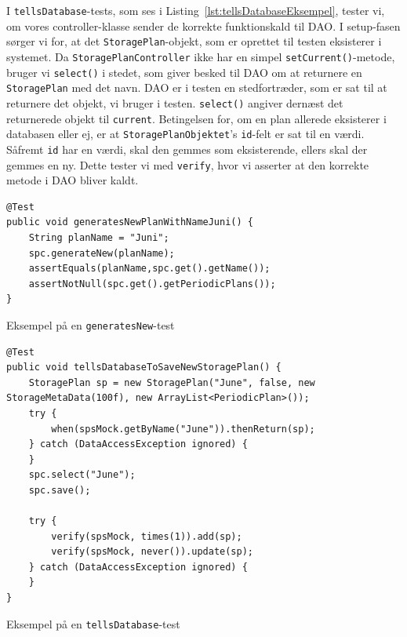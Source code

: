 I \texttt{tellsDatabase}-tests, som ses i Listing~\ref{lst:tellsDatabaseEksempel}, tester vi, om vores controller-klasse sender de korrekte funktionskald til DAO. I setup-fasen sørger vi for, at det \texttt{StoragePlan}-objekt, som er oprettet til testen eksisterer i systemet. Da \texttt{StoragePlanController} ikke har en simpel \texttt{setCurrent()}-metode, bruger vi \texttt{select()} i stedet, som giver besked til DAO om at returnere en \texttt{StoragePlan} med det navn. DAO er i testen en stedfortræder, som er sat til at returnere det objekt, vi bruger i testen. \texttt{select()} angiver dernæst det returnerede objekt til \texttt{current}. Betingelsen for, om en plan allerede eksisterer i databasen eller ej, er at \texttt{StoragePlanObjektet}'s \texttt{id}-felt er sat til en værdi. Såfremt \texttt{id} har en værdi, skal den gemmes som eksisterende, ellers skal der gemmes en ny. Dette tester vi med \texttt{verify}, hvor vi asserter at den korrekte metode i DAO bliver kaldt.

\begin{listing}[h]
    \begin{verbatim}
@Test
public void generatesNewPlanWithNameJuni() {
    String planName = "Juni";
    spc.generateNew(planName);
    assertEquals(planName,spc.get().getName());
    assertNotNull(spc.get().getPeriodicPlans());
}
    \end{verbatim}
    \caption{Eksempel på en \texttt{generatesNew}-test\label{lst:generatesNewEksempel}}
\end{listing}

\begin{listing}[h]
    \begin{verbatim}
@Test
public void tellsDatabaseToSaveNewStoragePlan() {
    StoragePlan sp = new StoragePlan("June", false, new StorageMetaData(100f), new ArrayList<PeriodicPlan>());
    try {
        when(spsMock.getByName("June")).thenReturn(sp);
    } catch (DataAccessException ignored) {
    }
    spc.select("June");
    spc.save();

    try {
        verify(spsMock, times(1)).add(sp);
        verify(spsMock, never()).update(sp);
    } catch (DataAccessException ignored) {
    }
}
    \end{verbatim}
    \caption{Eksempel på en \texttt{tellsDatabase}-test\label{lst:tellsDatabaseEksempel}}
\end{listing}

